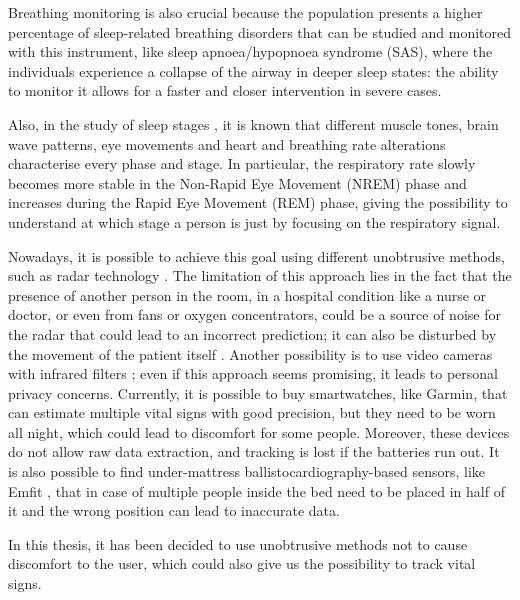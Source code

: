 Breathing monitoring is also crucial because the population presents a higher percentage of sleep-related breathing disorders that can be studied and monitored with this instrument, like sleep apnoea/hypopnoea syndrome (SAS)\cite{SasPatients},  where the individuals experience a collapse of the airway in deeper sleep states: the ability to monitor it allows for a faster and closer intervention in severe cases. 

Also, in the study of sleep stages \cite{Gasmi2020SleepVariables}, it is known that different muscle tones, brain wave patterns, eye movements and heart and breathing rate alterations characterise every phase and stage.
In particular, the respiratory rate slowly becomes more stable in the Non-Rapid Eye Movement (NREM) phase and increases during the Rapid Eye Movement (REM) phase, giving the possibility to understand at which stage a person is just by focusing on the respiratory signal\cite{Pal2022BreathingWakefulness}.


Nowadays, it is possible to achieve this goal using different unobtrusive methods, such as radar technology \cite{RadarSensor}. The limitation of this approach lies in the fact that the presence of another person in the room, in a hospital condition like a nurse or doctor, or even from fans or oxygen concentrators, could be a source of noise for the radar that could lead to an incorrect prediction; it can also be disturbed by the movement of the patient itself \cite{LauteslagerValidation}. Another possibility is to use video cameras with infrared filters \cite{CamerasBasedVitalSigns}; even if this approach seems promising, it leads to personal privacy concerns. 
Currently, it is possible to buy smartwatches, like Garmin\cite{garminUrl}, that can estimate multiple vital signs with good precision\cite{GarminArticol}, but they need to be worn all night, which could lead to discomfort for some people.
Moreover, these devices do not allow raw data extraction, and tracking is lost if the batteries run out. It is also possible to find under-mattress ballistocardiography-based sensors\cite{Tenhunen2013EmfitBreathing}, like Emfit \cite{emfitUrl}, that in case of multiple people inside the bed need to be placed in half of it and the wrong position can lead to inaccurate data.

In this thesis, it has been decided to use unobtrusive methods not to cause discomfort to the user, which could also give us the possibility to track vital signs. 

